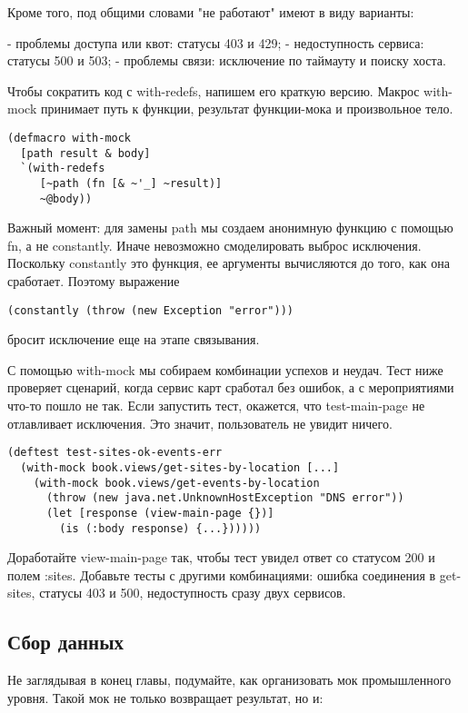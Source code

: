 Кроме того, под общими словами "не работают" имеют в виду варианты:

- проблемы доступа или квот: статусы 403 и 429;
- недоступность сервиса: статусы 500 и 503;
- проблемы связи: исключение по таймауту и поиску хоста.

Чтобы сократить код с with-redefs, напишем его краткую версию. Макрос with-mock
принимает путь к функции, результат функции-мока и произвольное тело.

\begin{verbatim}
(defmacro with-mock
  [path result & body]
  `(with-redefs
     [~path (fn [& ~'_] ~result)]
     ~@body))
\end{verbatim}

Важный момент: для замены path мы создаем анонимную функцию с помощью fn, а не
constantly. Иначе невозможно смоделировать выброс исключения. Поскольку
constantly это функция, ее аргументы вычисляются до того, как она
сработает. Поэтому выражение

\begin{verbatim}
(constantly (throw (new Exception "error")))
\end{verbatim}

бросит исключение еще на этапе связывания.

С помощью with-mock мы собираем комбинации успехов и неудач. Тест ниже проверяет
сценарий, когда сервис карт сработал без ошибок, а с мероприятиями что-то пошло
не так. Если запустить тест, окажется, что test-main-page не отлавливает
исключения. Это значит, пользователь не увидит ничего.

\begin{verbatim}
(deftest test-sites-ok-events-err
  (with-mock book.views/get-sites-by-location [...]
    (with-mock book.views/get-events-by-location
      (throw (new java.net.UnknownHostException "DNS error"))
      (let [response (view-main-page {})]
        (is (:body response) {...})))))
\end{verbatim}

Доработайте view-main-page так, чтобы тест увидел ответ со статусом 200 и полем
:sites. Добавьте тесты с другими комбинациями: ошибка соединения в get-sites,
статусы 403 и 500, недоступность сразу двух сервисов.

\subsection{Сбор данных}

Не заглядывая в конец главы, подумайте, как организовать мок промышленного
уровня. Такой мок не только возвращает результат, но и:


